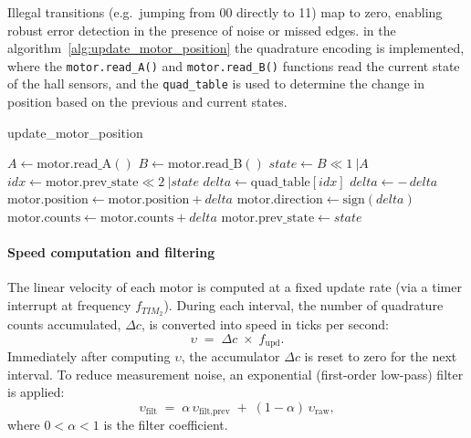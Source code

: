 Illegal transitions (e.g.\ jumping from 00 directly to 11) map to zero, enabling robust error detection in the presence of noise or missed edges.
in the algorithm~\ref{alg:update_motor_position} the quadrature encoding is implemented, where the \texttt{motor.read\_A()} and \texttt{motor.read\_B()} functions read the current state of the \gls{hall} sensors, and the \texttt{quad\_table} is used to determine the change in position based on the previous and current states.
\begin{algorithm}[H]
  \caption{update\_motor\_position}
  \begin{algorithmic}[1]
    \State $A \gets \text{motor.read\_A}()$
    \State $B \gets \text{motor.read\_B}()$
    \State $state \gets B\ll1~| A$
    \State $idx \gets \text{motor.prev\_state}\ll2~| state$
    \State $delta \gets \text{quad\_table}[idx]$
    \State $delta \gets -\,delta$
    \EndIf
    \State $\text{motor.position} \gets \text{motor.position} + delta$
    \State $\text{motor.direction} \gets \text{sign}(delta)$
    \State $\text{motor.counts} \gets \text{motor.counts} + delta$
    \EndIf
    \State $\text{motor.prev\_state} \gets state$
    \EndIf
    \EndFor
    \EndFunction
  \end{algorithmic}
  \label{alg:update_motor_position}
\end{algorithm}

\paragraph*{Speed computation and filtering}

The linear velocity of each motor is computed at a fixed update rate (via a timer interrupt at frequency \(f_{TIM_2}\)). During each interval, the number of quadrature counts accumulated, \(\Delta c\), is converted into speed in ticks per second:
\begin{equation}
  \upsilon \;=\; \Delta c \;\times\; f_{\text{upd}}.
\end{equation}
Immediately after computing \(\upsilon\), the accumulator \(\Delta c\) is reset to zero for the next interval. To reduce measurement noise, an exponential (first-order low-pass) filter is applied:
\begin{equation}
  \upsilon_{\text{filt}} \;=\; \alpha\,\upsilon_{\text{filt,prev}}
  \;+\;(1-\alpha)\,\upsilon_{\text{raw}},
\end{equation}
where \(0<\alpha<1\) is the filter coefficient.

